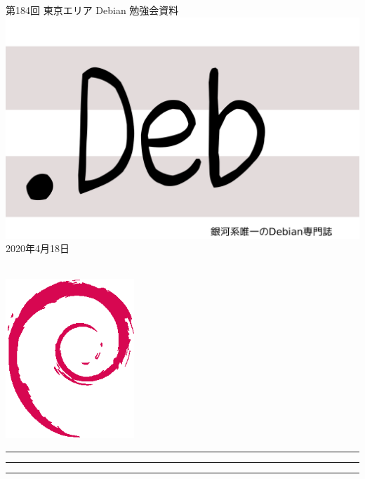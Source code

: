 \documentclass[mingoth,a4paper]{jsarticle}
\newcommand{\debmtgyear}{2020}
\newcommand{\debmtgmonth}{4}
\newcommand{\debmtgdate}{18}
\newcommand{\debmtgnumber}{184}
\begin{document}
\begin{titlepage}
\thispagestyle{empty}

\vspace*{-2cm}
第\debmtgnumber{}回 東京エリア Debian 勉強会資料\\
\hspace*{-2cm}
\includegraphics{image2012-natsu/dotdeb.pdf}\\
\hfill{}\debmtgyear{}年\debmtgmonth{}月\debmtgdate{}日

\\

\vspace*{-2cm}
\hfill{}\includegraphics[height=6cm]{image200502/openlogo-nd.eps}
\end{titlepage}

\newpage

\begin{minipage}[b]{0.2\hsize}
 \colorbox{titleback}{}
\end{minipage}
\begin{minipage}[b]{0.8\hsize}
\hrule
\vspace{2mm}
\hrule
\begin{multicols}{2}
\tableofcontents
\end{multicols}
\vspace{2mm}
\hrule
\end{minipage}
\end{document}

